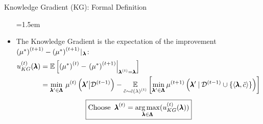 \begin{frame}[c]{Knowledge Gradient (KG): Formal Definition}
\begin{itemize}\belowdisplayskip=1.5em
    
    \item The Knowledge Gradient is the \alert{expectation of the improvement $\iter[\bocount+1]{\left(\mean^*\right)} - \iter[\bocount+1]{\left(\mean^*\right)} \!\given_{\!\conf}$}:
    \[
    \begin{split}
        \iter{\acq}_{KG}(\conf) 
        &= \E\left[ \iter{\left(\mean^*\right)} - \left. \iter[\bocount+1]{\left(\mean^*\right)} \right|_{\bonextsample=\conf} \right]\\
        &=\min_{\conf'\in\pcs} \, \iter{\mean} \left(\conf' \big| \iter[\bocount-1]{\dataset} \right)
        - \E_{\tilde{\cost} \sim \iter[\bocount]{\surro(\lambda)}}
        \left[\min_{\conf'\in\pcs}\iter[\bocount+1]{\mean}\left(\conf'\given{\iter[\bocount-1]{\dataset} \cup \left\{\left\langle\conf, \tilde{\cost} \right\rangle \right\}}\right)\right]
    \end{split}
    \]
\pause
\bigskip
\[
    \boxed{\text{Choose}\;\;\bonextsample = \argmax_{\conf\in\pcs}(\iter{\acq}_{KG}(\conf))}
    \]
\end{itemize}
\end{frame}



